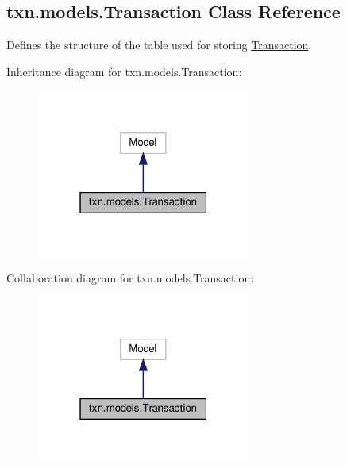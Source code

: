 \hypertarget{classtxn_1_1models_1_1Transaction}{}\subsection{txn.\+models.\+Transaction Class Reference}
\label{classtxn_1_1models_1_1Transaction}


Defines the structure of the table used for storing \hyperlink{classtxn_1_1models_1_1Transaction}{Transaction}.  




Inheritance diagram for txn.\+models.\+Transaction\+:\nopagebreak
\begin{figure}[H]
\begin{center}
\leavevmode
\includegraphics[width=199pt]{classtxn_1_1models_1_1Transaction__inherit__graph}
\end{center}
\end{figure}


Collaboration diagram for txn.\+models.\+Transaction\+:\nopagebreak
\begin{figure}[H]
\begin{center}
\leavevmode
\includegraphics[width=199pt]{classtxn_1_1models_1_1Transaction__coll__graph}
\end{center}
\end{figure}

